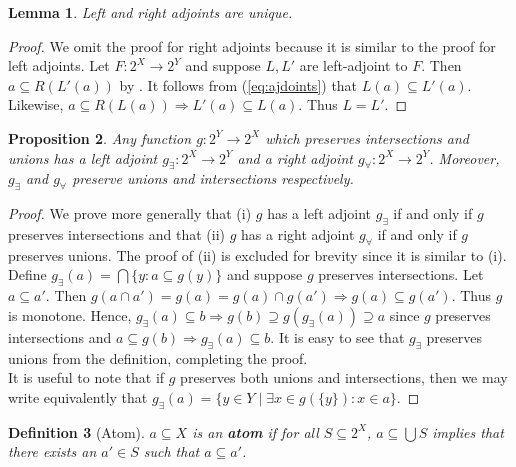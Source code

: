 \documentclass{article}
\newtheorem{proposition}{Proposition}[section]
\newtheorem{lemma}[proposition]{Lemma}
\newtheorem{definition}[proposition]{Definition}
\numberwithin{equation}{section}
\begin{document}
\begin{lemma}\label{lem:inv-img-adjoint-unique}
Left and right adjoints are unique.
\end{lemma}

\begin{proof}
We omit the proof for right adjoints because it is similar to the proof for left adjoints. Let $F : 2^X \to 2^Y$ and suppose $L, L'$ are left-adjoint to $F$. Then $a \subseteq R(L'(a))$ by . It follows from (\ref{eq:ajdoints}) that $L(a) \subseteq L'(a)$. Likewise, $a \subseteq R(L(a)) \Rightarrow L'(a) \subseteq L(a)$. Thus $L = L'$.
\end{proof}

\begin{proposition}\label{prop:inv-image-has-adjoints}
Any function $g : 2^Y \to 2^X$ which preserves intersections and unions has a left adjoint $g_\exists : 2^X \to 2^Y$ and a right adjoint $g_\forall : 2^X \to 2^Y$. Moreover, $g_\exists$ and $g_\forall$ preserve unions and intersections respectively.
\end{proposition}

\begin{proof}

We prove more generally that (i) $g$ has a left adjoint $g_\exists$ if and only if $g$ preserves intersections and that (ii) $g$ has a right adjoint $g_\forall$ if and only if $g$ preserves unions. The proof of (ii) is excluded for brevity since it is similar to (i). \\

Define $g_\exists(a) = \bigcap \{y : a \subseteq g(y)\}$ and suppose $g$ preserves intersections. Let $a \subseteq a'$. Then $g(a \cap a') = g(a) = g(a) \cap g(a') \Rightarrow g(a) \subseteq g(a')$. Thus $g$ is monotone. Hence, $g_\exists(a) \subseteq b \Rightarrow g(b) \supseteq g(g_\exists(a)) \supseteq a$ since $g$ preserves intersections and $a \subseteq g(b) \Rightarrow g_\exists(a) \subseteq b$. It is easy to see that $g_\exists$ preserves unions from the definition, completing the proof. \\

It is useful to note that if $g$ preserves both unions and intersections, then we may write equivalently that $g_\exists(a) = \{y \in Y \mid \exists x \in g(\{y\}) : x \in a \}$. 
\end{proof}

\begin{definition}[Atom]
$a \subseteq X$ is an \textbf{atom} if for all $S \subseteq 2^X$, $a \subseteq \bigcup S$ implies that there exists an $a' \in S$ such that $a \subseteq a'$.
\end{definition}
\end{document}
